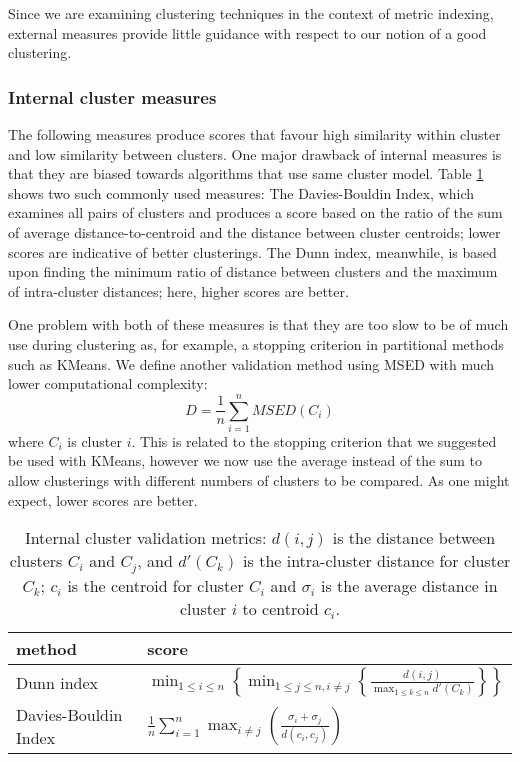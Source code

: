 Since we are examining clustering techniques in the context of metric indexing, external measures provide little guidance with respect to our notion of a good clustering.
\subsubsection{Internal cluster measures}
The following measures produce scores that favour high similarity within cluster and low similarity between clusters. One major drawback of internal measures is that they are biased towards algorithms that use same cluster model.  Table \ref{tab:cluster_validation} shows two such commonly used measures: The Davies-Bouldin Index, which examines all pairs of clusters and produces a score based on the ratio of the sum of average distance-to-centroid and the distance between cluster centroids; lower scores are indicative of better clusterings.  The Dunn index, meanwhile, is based upon finding the minimum ratio of distance between clusters and the maximum of intra-cluster distances; here, higher scores are better.

One problem with both of these measures is that they are too slow to be of much use during clustering as, for example, a stopping criterion in partitional methods such as KMeans.  We define another validation method using MSED with much lower computational complexity:
\[
	D = \frac{1}{n} \sum_{i = 1}^n MSED(C_i)
\]
where $C_i$ is cluster $i$. This is related to the stopping criterion that we suggested be used with KMeans, however we now use the average instead of the sum to allow clusterings with different numbers of clusters to be compared.  As one might expect, lower scores are better.
\begin{table}
\caption{
Internal cluster validation metrics: $d(i, j)$ is the distance between clusters $C_i$ and $C_j$, and $d'(C_k)$ is the intra-cluster distance for cluster $C_k$; $c_i$ is the centroid for cluster $C_i$ and $\sigma_i$ is the average distance in cluster $i$ to centroid  $c_i$.
}\label{tab:cluster_validation}
\begin{tabularx}{\textwidth}{Xl}
\hline
method & score\\
\hline
Dunn index & $\min_{1 \leq i \leq n} \left\lbrace \min_{1 \leq j \leq n, i \neq j} \left\lbrace \frac{d(i, j)}{\max_{1 \leq k \leq n} d'(C_k)} \right\rbrace \right\rbrace$\\
Davies-Bouldin Index & $\frac{1}{n} \sum_{i = 1}^n \max_{i \neq j} \left( \frac{\sigma_i + \sigma_j}{d(c_i, c_j)} \right)$\\
\hline
\end{tabularx}
\end{table}

